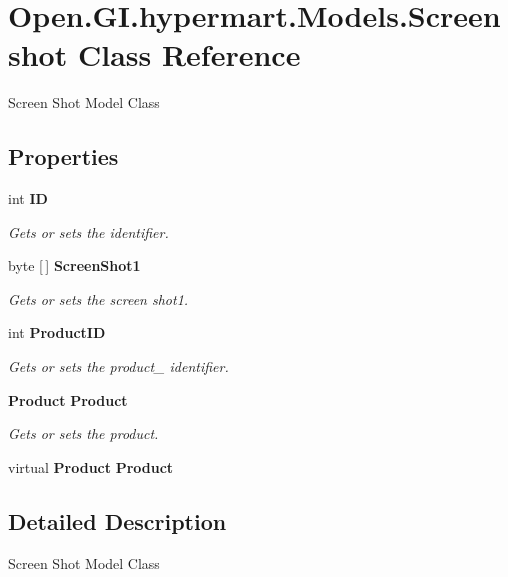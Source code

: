 \section{Open.\+G\+I.\+hypermart.\+Models.\+Screenshot Class Reference}
\label{class_open_1_1_g_i_1_1hypermart_1_1_models_1_1_screenshot}


Screen Shot Model Class  


\subsection*{Properties}
\begin{DoxyCompactItemize}
\item 
int \textbf{ ID}\hspace{0.3cm}{\ttfamily  [get, set]}
\begin{DoxyCompactList}\small\item\em Gets or sets the identifier. \end{DoxyCompactList}\item 
byte [$\,$] \textbf{ Screen\+Shot1}\hspace{0.3cm}{\ttfamily  [get, set]}
\begin{DoxyCompactList}\small\item\em Gets or sets the screen shot1. \end{DoxyCompactList}\item 
int \textbf{ Product\+ID}\hspace{0.3cm}{\ttfamily  [get, set]}
\begin{DoxyCompactList}\small\item\em Gets or sets the product\+\_\+ identifier. \end{DoxyCompactList}\item 
\textbf{ Product} \textbf{ Product}\hspace{0.3cm}{\ttfamily  [get, set]}
\begin{DoxyCompactList}\small\item\em Gets or sets the product. \end{DoxyCompactList}\item 
virtual \textbf{ Product} \textbf{ Product}\hspace{0.3cm}{\ttfamily  [get, set]}
\end{DoxyCompactItemize}


\subsection{Detailed Description}
Screen Shot Model Class 



